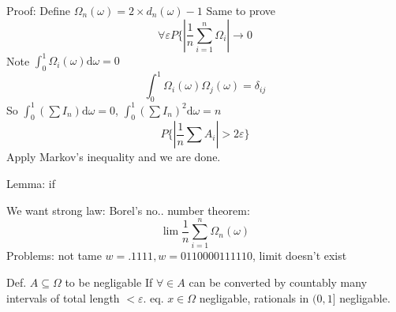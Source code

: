 \documentclass[a4paper,12pt]{article}
\begin{document}
Proof: Define $\Omega_n(\omega) = 2 \times d_n(\omega) - 1$
Same to prove
\[
	\forall \varepsilon
	P\{|\frac{1}{n}\sum_{i = 1}^n \Omega_i| \rightarrow 0
\]
Note $\int_0^1 \Omega_i(\omega)\mathrm{d}\omega = 0$
\[
	\int_0^1 \Omega_i(\omega)\Omega_j(\omega) = \delta_{ij}
\]
So $\int_0^1 (\sum I_n)\mathrm{d}\omega = 0$, $\int_0^1 (\sum I_n)^2 \mathrm{d}\omega = n$
\[
	P\{|\frac{1}{n}\sum A_i| > 2 \varepsilon\}
\]
Apply Markov's inequality and we are done.

Lemma: if %


We want strong law: Borel's no.. number theorem:
\[
	\lim \frac{1}{n} \sum_{i = 1}^n \Omega_n(\omega)
\]
Problems: not tame
$w = .1111, w = 0110000111110$, limit doesn't exist

Def. $A \subseteq \Omega$ to be negligable
If $\forall \in A$ can be converted by countably many intervals of total length $<\varepsilon$.
eq. $x \in \Omega$ negligable, rationals in $(0, 1]$ negligable.
\end{document}
